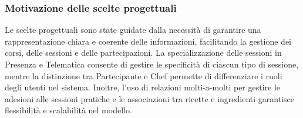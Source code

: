 \subsubsection{Motivazione delle scelte progettuali}
Le scelte progettuali sono state guidate dalla necessità di garantire una rappresentazione chiara e coerente delle informazioni, facilitando la gestione dei corsi, delle sessioni e delle partecipazioni. La specializzazione delle sessioni in Presenza e Telematica consente di gestire le specificità di ciascun tipo di sessione, mentre la distinzione tra Partecipante e Chef permette di differenziare i ruoli degli utenti nel sistema. Inoltre, l'uso di relazioni molti-a-molti per gestire le adesioni alle sessioni pratiche e le associazioni tra ricette e ingredienti garantisce flessibilità e scalabilità nel modello.

